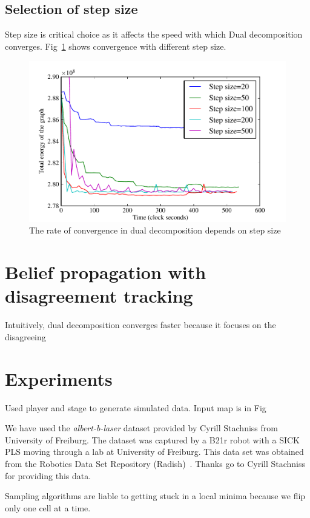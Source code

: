 \documentclass[letterpaper, 10 pt, conference]{ieeeconf} %
\begin{document}
\subsection{Selection of step size}
Step size is critical choice as it affects the speed with which Dual decomposition converges. Fig~\ref{fig:dualdecomposition-stepsize} shows convergence with different step size.
\begin{figure}
  \includegraphics[width=\columnwidth]{../figures/dualdecomposition-stepsize-inc500.pdf}
  \caption{The rate of convergence in dual decomposition depends on step size}
  \label{fig:dualdecomposition-stepsize}
\end{figure}
\section{Belief propagation with disagreement tracking}
Intuitively, dual decomposition converges faster because it focuses on the disagreeing 

\section{Experiments} 
Used player and stage to generate simulated data. Input map is in Fig

We have used the \emph{albert-b-laser} dataset provided by Cyrill Stachniss from University of Freiburg. The dataset was captured by a B21r robot with a SICK PLS moving through a lab at University of Freiburg.
This data set was obtained from the Robotics Data Set
Repository (Radish)~\cite{howard2003radish}. Thanks go to Cyrill Stachniss for providing this data.

\begin{figure}
\end{figure}
Sampling algorithms are liable to getting stuck in a local minima because we flip only one cell at a time.
\end{document}
